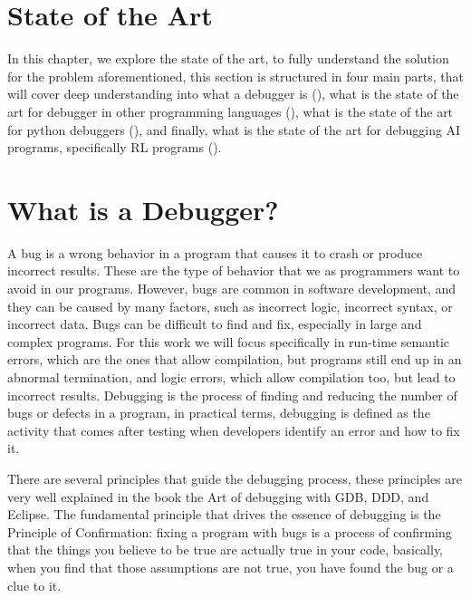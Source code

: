 
\section{State of the Art}
\label{sec:state_of_the_art}

In this chapter, we explore the state of the art, to fully understand the solution 
for the problem aforementioned, this section is structured in four main parts, that 
will cover deep understanding into what a debugger is (), what is the 
state of the art for debugger in other programming languages (), what 
is the state of the art for python debuggers (), and finally, what is the 
state of the art for debugging \ac{AI} programs, specifically \ac{RL} programs ().

\section{What is a Debugger?}
\label{sec:deb}
A bug is a wrong behavior in a program that causes it to crash or produce incorrect 
results. These are the type of behavior that we as programmers want to avoid in our
programs. However, bugs are common in software development, and they can be caused by 
many factors, such as incorrect logic, incorrect syntax, or incorrect data. Bugs can
be difficult to find and fix, especially in large and complex programs. For this work 
we will focus specifically in run-time semantic errors, which are the ones that allow 
compilation, but programs still end up in an abnormal termination, and logic 
errors, which allow compilation too, but lead to incorrect results. Debugging is the 
process of finding and reducing the number of 
bugs or defects in a program\cite{10.1007/978-3-642-32729-2_3}, in practical terms, 
debugging is defined as the activity that comes after testing when developers identify 
an error and how to fix it\cite{10.1080/08993400802114581}. 

There are several principles that guide the debugging process, these principles are 
very well explained in the book the Art of debugging with \ac{GDB}, \ac{DDD}, and Eclipse\cite{10.5555/1457534}.
The fundamental principle that drives the essence of debugging is the Principle of 
Confirmation: fixing a program with bugs is a process of confirming that the things you believe
to be true are actually true in your code\cite{10.5555/1457534}, basically, 
when you find that those assumptions are not true, you have found the bug or a clue to it.

